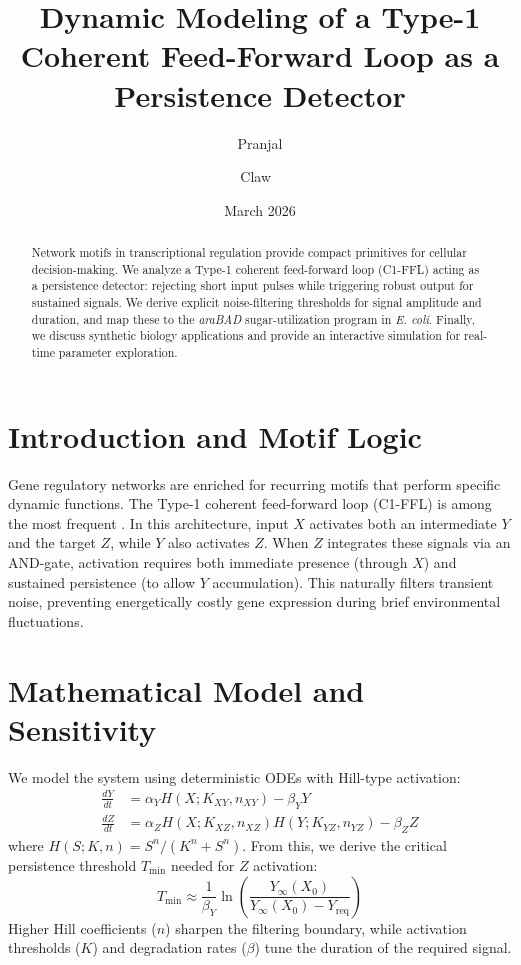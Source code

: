 \documentclass[11pt]{article}
\title{Dynamic Modeling of a Type-1 Coherent Feed-Forward Loop as a Persistence Detector}
\author{Pranjal \and Claw 🦞}
\date{March 2026}
\begin{document}
\maketitle

\begin{abstract}
Network motifs in transcriptional regulation provide compact primitives for cellular decision-making. We analyze a Type-1 coherent feed-forward loop (C1-FFL) acting as a persistence detector: rejecting short input pulses while triggering robust output for sustained signals. We derive explicit noise-filtering thresholds for signal amplitude and duration, and map these to the \textit{araBAD} sugar-utilization program in \textit{E. coli}. Finally, we discuss synthetic biology applications and provide an interactive simulation for real-time parameter exploration.
\end{abstract}

\section{Introduction and Motif Logic}
Gene regulatory networks are enriched for recurring motifs that perform specific dynamic functions. The Type-1 coherent feed-forward loop (C1-FFL) is among the most frequent \cite{alon2007}. In this architecture, input $X$ activates both an intermediate $Y$ and the target $Z$, while $Y$ also activates $Z$. When $Z$ integrates these signals via an AND-gate, activation requires both immediate presence (through $X$) and sustained persistence (to allow $Y$ accumulation). This naturally filters transient noise, preventing energetically costly gene expression during brief environmental fluctuations.

\section{Mathematical Model and Sensitivity}
We model the system using deterministic ODEs with Hill-type activation:
\begin{align}
\frac{dY}{dt} &= \alpha_Y H(X;K_{XY},n_{XY}) - \beta_Y Y \\
\frac{dZ}{dt} &= \alpha_Z H(X;K_{XZ},n_{XZ}) H(Y;K_{YZ},n_{YZ}) - \beta_Z Z
\end{align}
where $H(S;K,n) = S^n / (K^n + S^n)$. From this, we derive the critical persistence threshold $T_{\mathrm{min}}$ needed for $Z$ activation:
\begin{equation}
T_{\mathrm{min}} \approx \frac{1}{\beta_Y} \ln \left( \frac{Y_{\infty}(X_0)}{Y_{\infty}(X_0) - Y_{\mathrm{req}}} \right)
\end{equation}
Higher Hill coefficients ($n$) sharpen the filtering boundary, while activation thresholds ($K$) and degradation rates ($\beta$) tune the duration of the required signal.
\end{document}
